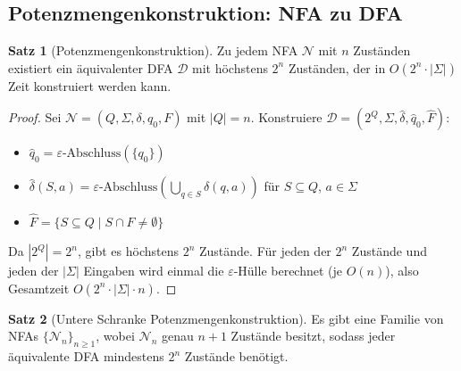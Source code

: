 ﻿\documentclass[a4paper,12pt]{article}
\theoremstyle{definition}
\newtheorem{satz}{Satz}
\begin{document}
\subsection{Potenzmengenkonstruktion: NFA zu DFA}

\begin{satz}[Potenzmengenkonstruktion]
	\label{satz:powerset}
	Zu jedem NFA $\mathcal{N}$ mit $n$ Zuständen existiert ein äquivalenter DFA
	$\mathcal{D}$ mit höchstens $2^n$ Zuständen, der in $O(2^n \cdot |\Sigma|)$
	Zeit konstruiert werden kann.
\end{satz}

\begin{proof}
	Sei $\mathcal{N} = (Q, \Sigma, \delta, q_0, F)$ mit $|Q| = n$.
	Konstruiere $\mathcal{D} = (2^Q, \Sigma, \hat{\delta}, \hat{q}_0, \hat{F})$:
	\begin{itemize}
		\item $\hat{q}_0 = \varepsilon\text{-}\mathrm{Abschluss}(\{q_0\})$
		\item $\hat{\delta}(S, a) = \varepsilon\text{-}\mathrm{Abschluss}
		      \!\left(\bigcup_{q \in S} \delta(q, a)\right)$ für $S \subseteq Q$,
		      $a \in \Sigma$
		\item $\hat{F} = \{S \subseteq Q \mid S \cap F \neq \emptyset\}$
	\end{itemize}
	Da $|2^Q| = 2^n$, gibt es höchstens $2^n$ Zustände. Für jeden der $2^n$
	Zustände und jeden der $|\Sigma|$ Eingaben wird einmal die
	$\varepsilon$-Hülle berechnet (je $O(n)$), also Gesamtzeit
	$O(2^n \cdot |\Sigma| \cdot n)$. \qedhere
\end{proof}

\begin{satz}[Untere Schranke Potenzmengenkonstruktion]
	\label{satz:powerset-lb}
	Es gibt eine Familie von NFAs $\{\mathcal{N}_n\}_{n \geq 1}$, wobei
	$\mathcal{N}_n$ genau $n+1$ Zustände besitzt, sodass jeder äquivalente DFA
	mindestens $2^n$ Zustände benötigt.
\end{satz}
\end{document}
